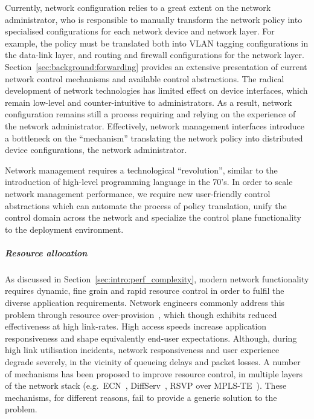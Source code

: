 Currently, network configuration relies to a great extent on the network
administrator, who is responsible to manually transform the network policy into
specialised configurations for each network device and network layer.  For
example, the policy must be translated both into VLAN tagging configurations in
the data-link layer, and routing and firewall configurations for the network
layer.  Section~\ref{sec:background:forwarding} provides an extensive
presentation of current network control mechanisms and available control
abstractions.  The radical development of network technologies has limited
effect on device interfaces, which remain low-level and counter-intuitive to
administrators. As a result, network configuration remains still a process
requiring and relying on the experience of the network administrator.  Effectively,
network management interfaces introduce a bottleneck on the ``mechanism''
translating the network policy into distributed device configurations, the
network administrator.  

Network management requires a technological ``revolution'', similar to the
introduction of high-level programming language in the 70's.  In order to scale
network management performance, we require new user-friendly control
abstractions which can automate the process of policy translation, unify the
control domain across the network and specialize the control plane functionality
to the deployment environment. 


\subparagraph*{Resource allocation} 

As discussed in Section~\ref{sec:intro:perf_complexity}, modern network
functionality requires dynamic, fine grain and rapid resource control in order
to fulfil the diverse application requirements.  Network engineers commonly
address this problem through resource over-provision~, which
though exhibits reduced effectiveness at high link-rates. High access speeds
increase application responsiveness and shape equivalently end-user
expectations.  Although, during high link utilisation incidents, network
responsiveness and user experience degrade severely, in the vicinity of queueing
delays and packet losses.  A number of mechanisms has been proposed to improve
resource control, in multiple layers of the network stack
(e.g.~ECN~, DiffServ~, RSVP over
MPLS-TE~). These mechanisms, for different reasons,  fail to
provide a generic solution to the problem. 

